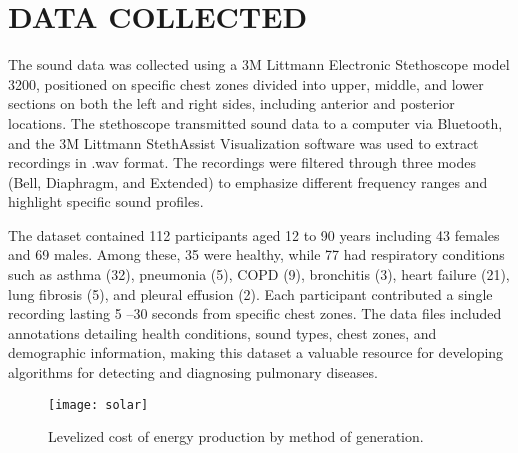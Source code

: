 \documentclass[twocolumn]{article}
\begin{document}
\section{DATA COLLECTED}  
The sound data was collected using a 3M Littmann Electronic Stethoscope model 3200, 
positioned on specific chest zones divided into upper, middle, and lower sections on both 
the left and right sides, including anterior and posterior locations. The stethoscope transmitted sound 
data to a computer via Bluetooth, and the 3M Littmann  StethAssist Visualization software was 
used to extract recordings in .wav format. The recordings were filtered through three modes 
(Bell, Diaphragm, and Extended) to emphasize different frequency ranges and highlight specific sound profiles.

The dataset contained 112 participants aged 12 to 90 years including 43 females and 
69 males. Among these, 35 were healthy, while 77 had respiratory conditions such as 
asthma (32), pneumonia (5), COPD (9), bronchitis (3), heart failure (21), lung 
fibrosis (5), and pleural effusion (2). Each participant contributed a single recording lasting 5
–30 seconds from specific chest zones. The data files included annotations detailing health conditions, 
sound types, chest zones, and demographic information, making this dataset a valuable resource 
for developing algorithms for detecting and diagnosing pulmonary diseases.

\begin{figure}[h]
  \centering
  \texttt{[image: solar]}
  \caption{Levelized cost of energy production by method of 
  generation. \cite{heart}}
  \label{fig:solar_cheap}
\end{figure}

\cite{telehealth}




\appendix
\end{document}
